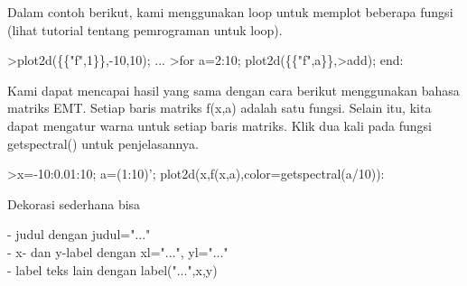\documentclass{article}
\begin{document}
\begin{eulernotebook}
\begin{eulercomment}
\begin{eulercomment}
\begin{eulercomment}
\begin{eulercomment}
\begin{eulercomment}
Dalam contoh berikut, kami menggunakan loop untuk memplot beberapa
fungsi (lihat tutorial tentang pemrograman untuk loop).
\end{eulercomment}
\begin{eulerprompt}
>plot2d(\{\{"f",1\}\},-10,10); ...
>for a=2:10; plot2d(\{\{"f",a\}\},>add); end:
\end{eulerprompt}
\begin{eulercomment}
Kami dapat mencapai hasil yang sama dengan cara berikut menggunakan
bahasa matriks EMT. Setiap baris matriks f(x,a) adalah satu fungsi.
Selain itu, kita dapat mengatur warna untuk setiap baris matriks. Klik
dua kali pada fungsi getspectral() untuk penjelasannya.
\end{eulercomment}
\begin{eulerprompt}
>x=-10:0.01:10; a=(1:10)'; plot2d(x,f(x,a),color=getspectral(a/10)):
\end{eulerprompt}
\begin{eulercomment}
Dekorasi sederhana bisa

- judul dengan judul="..."\\
- x- dan y-label dengan xl="...", yl="..."\\
- label teks lain dengan label("...",x,y)


\end{eulercomment}
\end{eulercomment}
\end{eulercomment}
\end{eulercomment}
\end{eulercomment}
\end{eulernotebook}
\end{document}
